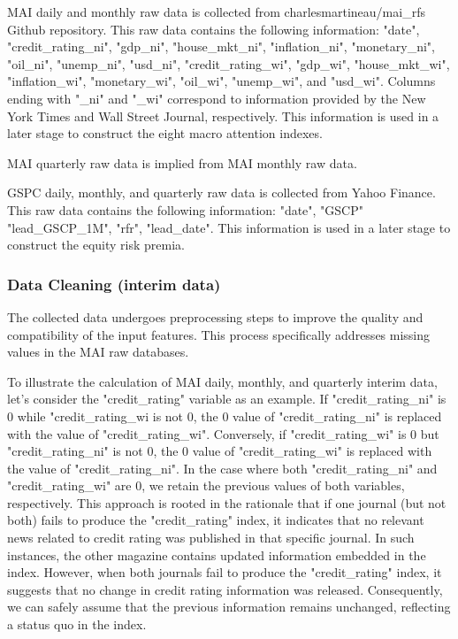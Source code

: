 \documentclass{article}
\begin{document}
MAI daily and monthly raw data is collected from charlesmartineau/mai\_rfs Github repository. This raw data contains the following information: "date", "credit\_rating\_ni", "gdp\_ni", "house\_mkt\_ni", "inflation\_ni", "monetary\_ni", "oil\_ni", "unemp\_ni", "usd\_ni", "credit\_rating\_wi", "gdp\_wi", "house\_mkt\_wi", "inflation\_wi", "monetary\_wi", "oil\_wi", "unemp\_wi", and "usd\_wi". Columns ending with "\_ni" and "\_wi" correspond to information provided by the New York Times and Wall Street Journal, respectively. This information is used in a later stage to construct the eight macro attention indexes.

MAI quarterly raw data is implied from MAI monthly raw data.

GSPC daily, monthly, and quarterly raw data is collected from Yahoo Finance. This raw data contains the following information: "date", "GSCP"	"lead\_GSCP\_1M", "rfr", "lead\_date". This information is used in a later stage to construct the equity risk premia.

\subsubsection{Data Cleaning (interim data)}

The collected data undergoes preprocessing steps to improve the quality and compatibility of the input features. This process specifically addresses missing values in the MAI raw databases.

To illustrate the calculation of MAI daily, monthly, and quarterly interim data, let's consider the "credit\_rating" variable as an example. If "credit\_rating\_ni" is $0$ while "credit\_rating\_wi is not $0$, the $0$ value of "credit\_rating\_ni" is replaced with the value of "credit\_rating\_wi". Conversely, if "credit\_rating\_wi" is $0$ but "credit\_rating\_ni" is not $0$, the $0$ value of "credit\_rating\_wi" is replaced with the value of "credit\_rating\_ni". In the case where both "credit\_rating\_ni" and "credit\_rating\_wi" are $0$, we retain the previous values of both variables, respectively. This approach is rooted in the rationale that if one journal (but not both) fails to produce the "credit\_rating" index, it indicates that no relevant news related to credit rating was published in that specific journal. In such instances, the other magazine contains updated information embedded in the index. However, when both journals fail to produce the "credit\_rating" index, it suggests that no change in credit rating information was released. Consequently, we can safely assume that the previous information remains unchanged, reflecting a status quo in the index.
\end{document}
